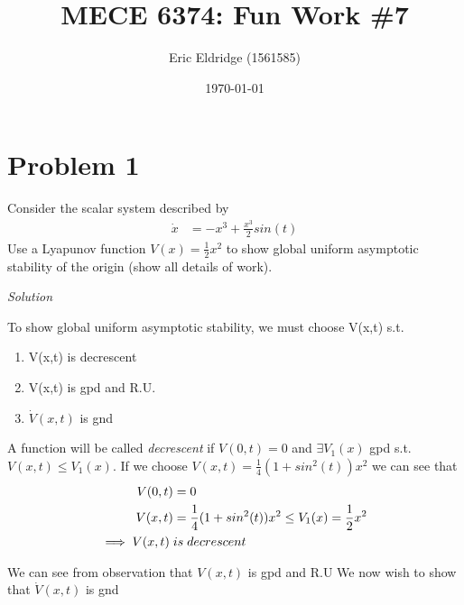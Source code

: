 \documentclass{article}
\title{MECE 6374: Fun Work \#7}
\date{\today}
\author{Eric Eldridge (1561585)}
\begin{document}

  \maketitle

  \section{Problem 1}

  Consider the scalar system described by 
  \begin{align*}
    \dot{x} &= -x^3 + \frac{x^3}{2}sin(t)
  \end{align*}
  Use a Lyapunov function $V(x)=\frac{1}{2}x^2$ to show global uniform
  asymptotic stability of the origin (show all details of work). 
  \newline \newline

  \noindent \textit{Solution} \newline \newline

  To show global uniform asymptotic stability, we must choose V(x,t) s.t.
  \begin{enumerate}[label=(\roman*)]
    \item V(x,t) is decrescent
    \item V(x,t) is gpd and R.U.
    \item $\dot{V}(x,t)$ is gnd
  \end{enumerate} 

  A function will be called \textit{decrescent} if $V(0,t)=0$ and $\exists
  V_1(x)$ gpd s.t. $V(x,t) \leq V_1(x)$. \newline
  If we choose $V(x,t)=\frac{1}{4}(1+sin^2(t))x^2$ we can see that \newline
  \begin{align*}
    V(0,t) &= 0 \\
    V(x,t) &= \frac{1}{4}(1+sin^2(t))x^2 \leq V_1(x)=\frac{1}{2}x^2 \\
    \implies V(x,t) \hspace{1mm} & is \hspace{1mm}decrescent
  \end{align*}

  We can see from observation that $V(x,t)$ is gpd and R.U \newline
  We now wish to show that $\dot{V}(x,t)$ is gnd
\end{document}
